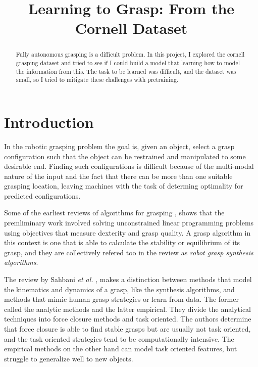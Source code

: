 \documentclass{article}
\title{Learning to Grasp: From the Cornell Dataset}
\begin{document}
\maketitle

\begin{abstract}
Fully autonomous grasping is a difficult problem. In this project, I explored
the cornell grasping dataset and tried to see if I could build a model that
learning how to model the information from this. The task to be learned was
difficult, and the dataset was small, so I tried to mitigate these challenges
with pretraining.
\end{abstract}

\section{Introduction}
In the robotic grasping problem the goal is, given an object, select a grasp
configuration such that the object can be restrained and
manipulated to some desirable end. Finding such configurations is difficult
because of the multi-modal nature of the input and the fact that there can be
more than one suitable grasping location, leaving machines with the task
of determing optimality for predicted configurations.

Some of the earliest reviews of algorithms for grasping \cite{shimoga96,bicchi00},
shows that the premliminary work involved solving unconstrained linear programming
problems using objectives that measure dexterity and grasp quality. A grasp
algorithm in this context is one that is able to calculate the stability or
equilibrium of its grasp, and they are collectively refered too in the
review as \textit{robot grasp synthesis algorithms}.

The review by Sahbani \textit{et al.} \cite{sahbani12}, makes a distinction
between methods that model the kinematics and dynamics of a grasp, like the
synthesis algorithms, and methods that mimic human grasp strategies or learn
from data. The former called the analytic methods and the latter empirical.
They divide the analytical techniques into force closure methods and task
oriented. The authors determine that force closure is able to find stable
grasps but are usually not task oriented, and the task oriented strategies tend
to be computationally intensive. The empirical methods on the other hand can
model task oriented features, but struggle to generalize well to new objects.
\end{document}
